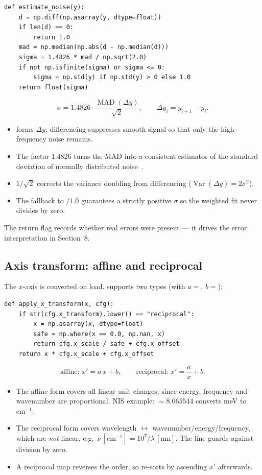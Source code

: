\documentclass[11pt,a4paper]{article}
\begin{document}
\begin{lstlisting}[style=py]
def estimate_noise(y):
    d = np.diff(np.asarray(y, dtype=float))
    if len(d) == 0:
        return 1.0
    mad = np.median(np.abs(d - np.median(d)))
    sigma = 1.4826 * mad / np.sqrt(2.0)
    if not np.isfinite(sigma) or sigma <= 0:
        sigma = np.std(y) if np.std(y) > 0 else 1.0
    return float(sigma)
\end{lstlisting}
\[
\sigma = 1.4826\cdot\frac{\operatorname{MAD}(\Delta y)}{\sqrt 2},
\qquad \Delta y_i = y_{i+1}-y_i.
\]
\begin{itemize}
\item {} forms $\Delta y$; differencing suppresses smooth signal so
that only the high-frequency noise remains.
\item The factor $1.4826$ turns the MAD into a consistent estimator of the
standard deviation of normally distributed noise~\citep{RousseeuwCroux1993}.
\item $1/\sqrt 2$ corrects the variance doubling from differencing
($\operatorname{Var}(\Delta y)=2\sigma^2$).
\item The fallback to /$1.0$ guarantees a strictly positive $\sigma$
so the weighted fit never divides by zero.
\end{itemize}
The return flag  records whether real errors were present --- it
drives the error interpretation in Section~8.

\subsection{Axis transform: affine and reciprocal}
The $x$-axis is converted on load.  supports two types
(with $a=$, $b=$):

\begin{lstlisting}[style=py]
def apply_x_transform(x, cfg):
    if str(cfg.x_transform).lower() == "reciprocal":
        x = np.asarray(x, dtype=float)
        safe = np.where(x == 0.0, np.nan, x)
        return cfg.x_scale / safe + cfg.x_offset
    return x * cfg.x_scale + cfg.x_offset
\end{lstlisting}
\[
\text{affine: } x' = a\,x + b,
\qquad
\text{reciprocal: } x' = \frac{a}{x} + b.
\]
\begin{itemize}
\item The affine form covers all linear unit changes, since energy, frequency and
wavenumber are proportional. NIS example: ${}=8.065544$ converts
meV to $\mathrm{cm}^{-1}$.
\item The reciprocal form covers wavelength $\leftrightarrow$
wavenumber/energy/frequency, which are \emph{not} linear, e.g.\
$\tilde\nu\,[\mathrm{cm}^{-1}] = 10^{7}/\lambda\,[\mathrm{nm}]$. The line
\code{np.where(x==0, np.nan, x)} guards against division by zero.
\item A reciprocal map reverses the order, so \code{load_xy()} re-sorts by
ascending $x'$ afterwards.
\end{itemize}
\end{document}
